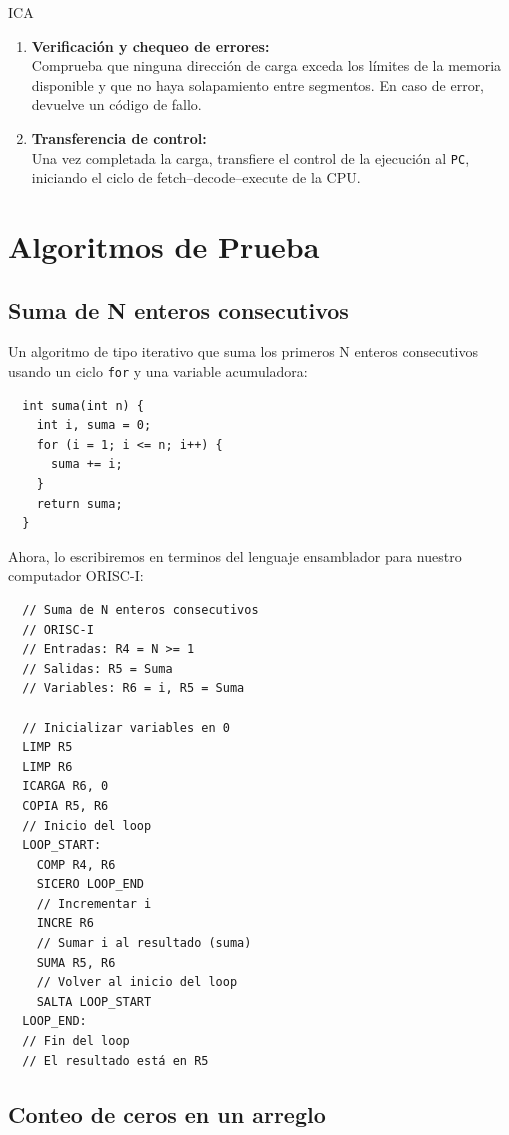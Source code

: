 ICA\documentclass{article}
\begin{document}
\begin{enumerate}
\item \textbf{Verificación y chequeo de errores:}\\
Comprueba que ninguna dirección de carga exceda los límites de la memoria disponible y que no haya solapamiento entre segmentos. En caso de error, devuelve un código de fallo.

\item \textbf{Transferencia de control:}\\
Una vez completada la carga, transfiere el control de la ejecución al \texttt{PC}, iniciando el ciclo de fetch–decode–execute de la CPU.
\end{enumerate}


\section{Algoritmos de Prueba}

\subsection{Suma de N enteros consecutivos}

Un algoritmo de tipo iterativo que suma los primeros N enteros
consecutivos usando un ciclo \texttt{for} y una variable acumuladora:

\begin{verbatim}
  int suma(int n) {
    int i, suma = 0;
    for (i = 1; i <= n; i++) {
      suma += i;
    }
    return suma;
  }
\end{verbatim}

Ahora, lo escribiremos en terminos del lenguaje ensamblador para nuestro computador ORISC-I:

\begin{verbatim}
  // Suma de N enteros consecutivos
  // ORISC-I
  // Entradas: R4 = N >= 1
  // Salidas: R5 = Suma
  // Variables: R6 = i, R5 = Suma

  // Inicializar variables en 0
  LIMP R5
  LIMP R6
  ICARGA R6, 0
  COPIA R5, R6
  // Inicio del loop
  LOOP_START:
    COMP R4, R6
    SICERO LOOP_END
    // Incrementar i
    INCRE R6
    // Sumar i al resultado (suma)
    SUMA R5, R6
    // Volver al inicio del loop
    SALTA LOOP_START
  LOOP_END:
  // Fin del loop
  // El resultado está en R5
\end{verbatim}

\subsection{Conteo de ceros en un arreglo}
\end{document}
